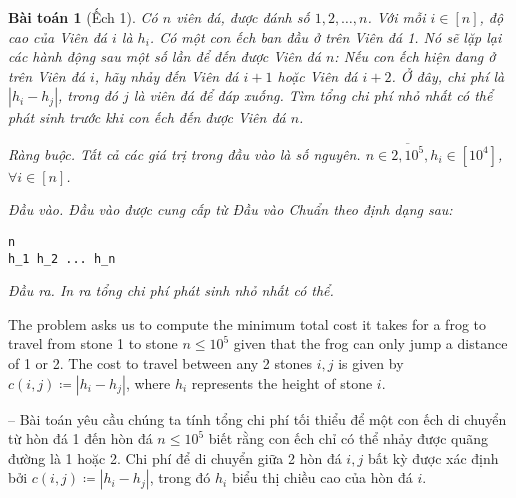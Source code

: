 \documentclass{article}
\newtheorem{baitoan}{Bài toán}
\begin{document}
\begin{baitoan}[Ếch 1]
    Có $n$ viên đá, được đánh số $1, 2,\ldots, n$. Với mỗi $i\in[n]$, độ cao của Viên đá $i$ là $h_i$. Có một con ếch ban đầu ở trên Viên đá 1. Nó sẽ lặp lại các hành động sau một số lần để đến được Viên đá $n$: Nếu con ếch hiện đang ở trên Viên đá $i$, hãy nhảy đến Viên đá $i + 1$ hoặc Viên đá $i + 2$. Ở đây, chi phí là $|h_i - h_j|$, trong đó $j$ là viên đá để đáp xuống. Tìm tổng chi phí nhỏ nhất có thể phát sinh trước khi con ếch đến được Viên đá $n$.
    \item {\sf Ràng buộc.} Tất cả các giá trị trong đầu vào là số nguyên. $n\in\overline{2,10^5}, h_i\in[10^4]$, $\forall i\in[n]$.
    \item {\sf Đầu vào.} Đầu vào được cung cấp từ Đầu vào Chuẩn theo định dạng sau:
    \begin{verbatim}
n
h_1 h_2 ... h_n
    \end{verbatim}
    \item {\sf Đầu ra.} In ra tổng chi phí phát sinh nhỏ nhất có thể.
\end{baitoan}
The problem asks us to compute the minimum total cost it takes for a frog to travel from stone 1 to stone $n\le10^5$ given that the frog can only jump a distance of 1 or 2. The cost to travel between any 2 stones $i,j$ is given by $c(i,j)\coloneqq|h_i - h_j|$, where $h_i$ represents the height of stone $i$.

-- Bài toán yêu cầu chúng ta tính tổng chi phí tối thiểu để một con ếch di chuyển từ hòn đá 1 đến hòn đá $n\le10^5$ biết rằng con ếch chỉ có thể nhảy được quãng đường là 1 hoặc 2. Chi phí để di chuyển giữa 2 hòn đá $i,j$ bất kỳ được xác định bởi $c(i,j)\coloneqq|h_i - h_j|$, trong đó $h_i$ biểu thị chiều cao của hòn đá $i$.
\end{document}
